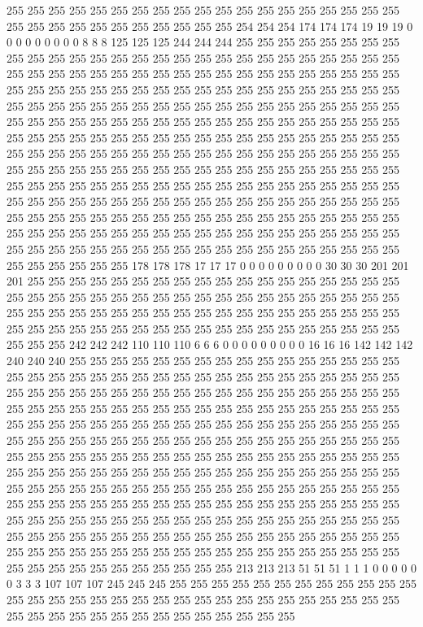 255 255 255 255 255 255 255 255 255 255 255 255 255 255 255 255 255 255 255 255 255 255 255 255 255 255 255 255 255 255 254 254 254 174 174 174 19 19 19 0 0 0 0 0 0 0 0 0 8 8 8 125 125 125 244 244 244 255 255 255 255 255 255 255 255 255 255 255 255 255 255 255 255 255 255 255 255 255 255 255 255 255 255 255 255 255 255 255 255 255 255 255 255 255 255 255 255 255 255 255 255 255 255 255 255 255 255 255 255 255 255 255 255 255 255 255 255 255 255 255 255 255 255 255 255 255 255 255 
255 255 255 255 255 255 255 255 255 255 255 255 255 255 255 255 255 255 255 255 255 255 255 255 255 255 255 255 255 255 255 255 255 255 255 255 255 255 255 255 255 255 255 255 255 255 255 255 255 255 255 255 255 255 255 255 255 255 255 255 255 255 255 255 255 255 255 255 255 255 255 255 255 255 255 255 255 255 255 255 255 255 255 255 255 255 255 255 255 255 255 255 255 255 255 255 255 255 255 255 255 255 255 255 255 255 255 255 255 255 255 255 255 255 255 255 255 255 255 255 255 255 255 255 255 255 255 255 
255 255 255 255 255 255 255 255 255 255 255 255 255 255 255 255 255 255 255 255 255 255 255 255 255 255 255 255 255 255 255 255 255 255 255 255 255 255 255 255 255 255 255 255 255 255 255 255 255 255 255 255 255 255 255 255 255 255 255 255 255 255 178 178 178 17 17 17 0 0 0 0 0 0 0 0 0 30 30 30 201 201 201 255 255 255 255 255 255 255 255 255 255 255 255 255 255 255 255 255 255 255 255 255 255 255 255 255 255 255 255 255 255 255 255 255 255 255 255 255 255 255 255 255 255 255 255 255 
255 255 255 255 255 255 255 255 255 255 255 255 255 255 255 255 255 255 255 255 255 255 255 255 255 255 255 255 255 255 255 255 255 242 242 242 110 110 110 6 6 6 0 0 0 0 0 0 0 0 0 16 16 16 142 142 142 240 240 240 255 255 255 255 255 255 255 255 255 255 255 255 255 255 255 255 255 255 255 255 255 255 255 255 255 255 255 255 255 255 255 255 255 255 255 255 255 255 255 255 255 255 255 255 255 255 255 255 255 255 255 255 255 255 255 255 255 255 255 255 255 255 255 255 255 255 255 255 
255 255 255 255 255 255 255 255 255 255 255 255 255 255 255 255 255 255 255 255 255 255 255 255 255 255 255 255 255 255 255 255 255 255 255 255 255 255 255 255 255 255 255 255 255 255 255 255 255 255 255 255 255 255 255 255 255 255 255 255 255 255 255 255 255 255 255 255 255 255 255 255 255 255 255 255 255 255 255 255 255 255 255 255 255 255 255 255 255 255 255 255 255 255 255 255 255 255 255 255 255 255 255 255 255 255 255 255 255 255 255 255 255 255 255 255 255 255 255 255 255 255 255 255 255 255 255 255 
255 255 255 255 255 255 255 255 255 255 255 255 255 255 255 255 255 255 255 255 255 255 255 255 255 255 255 255 255 255 255 255 255 255 255 255 255 255 255 255 255 255 255 255 255 255 255 255 255 255 255 255 255 255 255 255 255 255 255 213 213 213 51 51 51 1 1 1 0 0 0 0 0 0 3 3 3 107 107 107 245 245 245 255 255 255 255 255 255 255 255 255 255 255 255 255 255 255 255 255 255 255 255 255 255 255 255 255 255 255 255 255 255 255 255 255 255 255 255 255 255 255 255 255 255 255 255 255 
